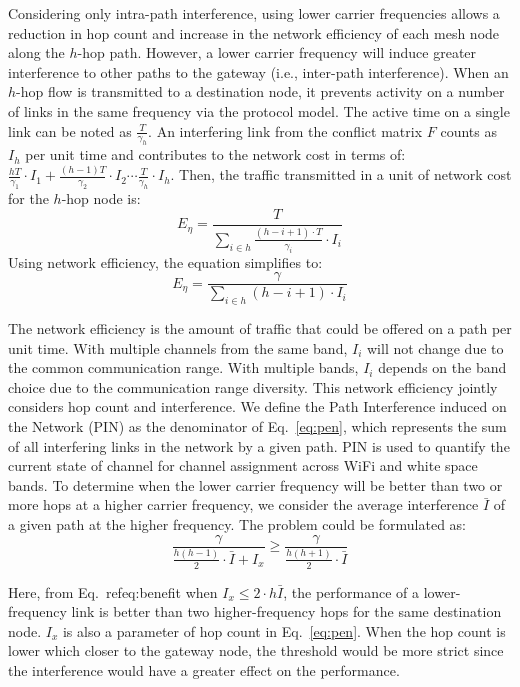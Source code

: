 Considering only intra-path interference, using lower carrier frequencies allows a reduction in hop count and increase 
in the network efficiency of each mesh node along the $h$-hop path. However, a lower carrier frequency will induce 
greater interference to other paths to the gateway (i.e., inter-path interference). 
When an $h$-hop flow is transmitted to a destination node, it prevents 
activity on a number of links in the same frequency via the protocol model. 
The active time on a single link can be noted as 
$\frac{T}{\gamma_h}$. 
An interfering link from the conflict matrix $F$ counts as $I_h$ per unit time
and contributes to the network cost in terms of:
$\frac{hT}{\gamma_1}\cdot I_1 + \frac{(h-1)T}{\gamma_2}\cdot I_2 \cdots \frac{T}{\gamma_h}\cdot I_h$.
Then, the traffic transmitted in a unit of network cost for the $h$-hop node is:
\begin{equation}
\label{eq:originpen}
E_{\eta}=\frac{T}{\sum_{i \in h}\frac{(h-i+1)\cdot T}{\gamma_i}\cdot I_i }
\end{equation}
Using network efficiency, the equation simplifies to:
\begin{equation}
\label{eq:pen}
E_{\eta}=\frac{\gamma}{\sum_{i \in h} (h-i+1)\cdot I_i}
\end{equation}

The network efficiency is the amount of traffic that could be 
offered on a path per unit time. With multiple channels from the same band,
$I_i$ will not change due to the common communication range. With multiple
bands, $I_i$ depends on the band choice due to the communication range diversity.  
This network efficiency jointly considers hop count and interference. We define
the Path Interference induced on the Network (PIN) as the denominator of Eq.~\ref{eq:pen},
which represents the sum of all interfering links in the network by a given path. 
PIN is used to quantify the current state of channel for channel assignment
across WiFi and white space bands.
To determine when the lower carrier frequency will be better than two or more hops at a
higher carrier frequency, we consider the average interference $\bar{I}$ of a given path
at the higher frequency.  The problem could be formulated as:
\begin{equation}
\label{eq:benefit}
\frac{\gamma}{\frac{h(h-1)}{2}\cdot \bar{I}+I_x} \geq \frac{\gamma}{\frac{h(h+1)}{2}\cdot \bar{I}}
\end{equation}

Here, from Eq.~ref{eq:benefit} when $I_x \leq 2\cdot h\bar{I}$, the performance of a lower-frequency link  
is better than two higher-frequency hops for the same destination node. $I_x$ is also a parameter of hop count 
in Eq.~\ref{eq:pen}. When the hop count is lower which closer to the gateway node, the threshold 
would be more strict since the interference would have a greater effect on the performance.






